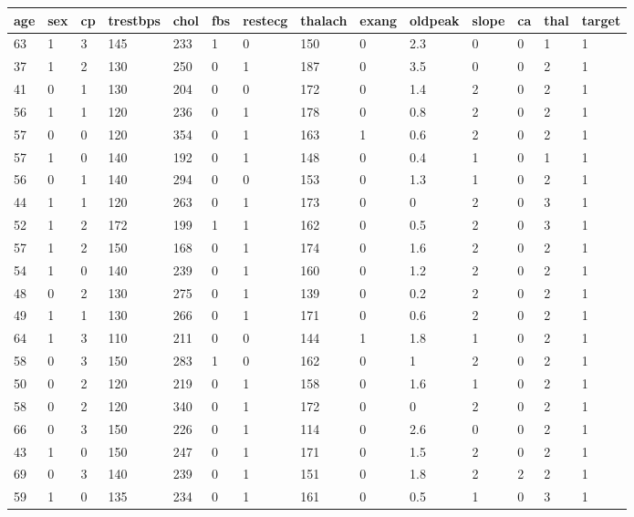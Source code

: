 \documentclass{article}
\begin{document}
\begin{table}[h!]
\centering
\begin{tabular}{|l|l|l|l|l|l|l|l|l|l|l|l|l|l|}
\hline
age & sex & cp & trestbps & chol & fbs & restecg & thalach & exang & oldpeak & slope & ca & thal & target \\ \hline63 & 1 & 3 & 145 & 233 & 1 & 0 & 150 & 0 & 2.3 & 0  &0 & 1 & 1 \\ \hline
37 & 1 & 2 & 130 & 250 & 0 & 1 & 187 & 0 & 3.5 & 0  &0 & 2 & 1 \\ \hline
41 & 0 & 1 & 130 & 204 & 0 & 0 & 172 & 0 & 1.4 & 2  &0 & 2 & 1 \\ \hline
56 & 1 & 1 & 120 & 236 & 0 & 1 & 178 & 0 & 0.8 & 2  &0 & 2 & 1 \\ \hline
57 & 0 & 0 & 120 & 354 & 0 & 1 & 163 & 1 & 0.6 & 2  &0 & 2 & 1 \\ \hline
57 & 1 & 0 & 140 & 192 & 0 & 1 & 148 & 0 & 0.4 & 1  &0 & 1 & 1 \\ \hline
56 & 0 & 1 & 140 & 294 & 0 & 0 & 153 & 0 & 1.3 & 1  &0 & 2 & 1 \\ \hline
44 & 1 & 1 & 120 & 263 & 0 & 1 & 173 & 0 & 0 & 2  &0 & 3 & 1 \\ \hline
52 & 1 & 2 & 172 & 199 & 1 & 1 & 162 & 0 & 0.5 & 2  &0 & 3 & 1 \\ \hline
57 & 1 & 2 & 150 & 168 & 0 & 1 & 174 & 0 & 1.6 & 2  &0 & 2 & 1 \\ \hline
54 & 1 & 0 & 140 & 239 & 0 & 1 & 160 & 0 & 1.2 & 2  &0 & 2 & 1 \\ \hline
48 & 0 & 2 & 130 & 275 & 0 & 1 & 139 & 0 & 0.2 & 2  &0 & 2 & 1 \\ \hline
49 & 1 & 1 & 130 & 266 & 0 & 1 & 171 & 0 & 0.6 & 2  &0 & 2 & 1 \\ \hline
64 & 1 & 3 & 110 & 211 & 0 & 0 & 144 & 1 & 1.8 & 1  &0 & 2 & 1 \\ \hline
58 & 0 & 3 & 150 & 283 & 1 & 0 & 162 & 0 & 1 & 2  &0 & 2 & 1 \\ \hline
50 & 0 & 2 & 120 & 219 & 0 & 1 & 158 & 0 & 1.6 & 1  &0 & 2 & 1 \\ \hline
58 & 0 & 2 & 120 & 340 & 0 & 1 & 172 & 0 & 0 & 2  &0 & 2 & 1 \\ \hline
66 & 0 & 3 & 150 & 226 & 0 & 1 & 114 & 0 & 2.6 & 0  &0 & 2 & 1 \\ \hline
43 & 1 & 0 & 150 & 247 & 0 & 1 & 171 & 0 & 1.5 & 2  &0 & 2 & 1 \\ \hline
69 & 0 & 3 & 140 & 239 & 0 & 1 & 151 & 0 & 1.8 & 2  &2 & 2 & 1 \\ \hline
59 & 1 & 0 & 135 & 234 & 0 & 1 & 161 & 0 & 0.5 & 1  &0 & 3 & 1 \\ \hline

\end{tabular}
\end{table}
\end{document}
